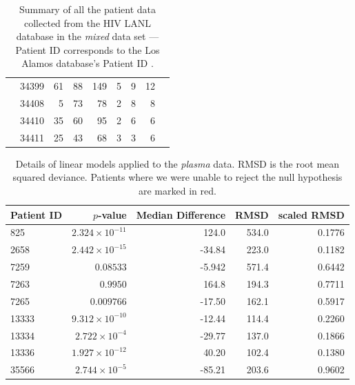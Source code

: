 \documentclass[12pt]{article}
\newcommand{\badpat}[1]{\rowcolor{red}#1}
\begin{document}
\begin{table}[!ht]
\begin{center}
\begin{tabular}{llrrrrrrr}
& 34399 &      61 &       88 &      149 &        5 &        9 &       12 \\
& 34408 &       5 &       73 &       78 &        2 &        8 &        8 \\
& 34410 &      35 &       60 &       95 &        2 &        6 &        6 \\
& 34411 &      25 &       43 &       68 &        3 &        3 &        6   \\
\hline
\end{tabular}
\end{center}
  \caption{Summary of all the patient data collected from the HIV LANL database in the \emph{mixed} data set --- Patient ID corresponds to the Los Alamos database's Patient ID \citep{LosAlamos}.
   }\label{tab:patients} 
\end{table}

\begin{table}[!ht]
\def\arraystretch{1.3}%
\begin{center}
\begin{tabular}{lrrrr} 
Patient ID & $p$-value & Median Difference & RMSD & scaled RMSD \\ 
\hline
825 & $2.324 \times 10^{-11}$ & 124.0 & 534.0 & 0.1776 \\
2658 & $2.442 \times 10^{-15}$  & -34.84 & 223.0 & 0.1182 \\
\badpat{7259 & $0.08533$ & -5.942 & 571.4 & 0.6442} \\
\badpat{7263 & $0.9950$ & 164.8 & 194.3 & 0.7711} \\
7265 & $0.009766$ & -17.50 & 162.1 & 0.5917 \\
13333 & $9.312 \times 10^{-10}$ & -12.44 & 114.4 & 0.2260 \\
13334 & $2.722 \times 10^{-4}$ & -29.77 & 137.0 & 0.1866 \\
13336 & $1.927 \times 10^{-12}$ & 40.20 & 102.4 & 0.1380 \\
35566 & $2.744 \times 10^{-5}$ & -85.21 & 203.6 & 0.9602 \\
\hline
\end{tabular}
\end{center}
  \caption{Details of linear models applied to the \emph{plasma} data. RMSD is the root mean squared deviance. Patients where we were unable to reject the null hypothesis are marked in red.
   }\label{tab:patientsplasmaerror} 
\end{table}
\end{document}
